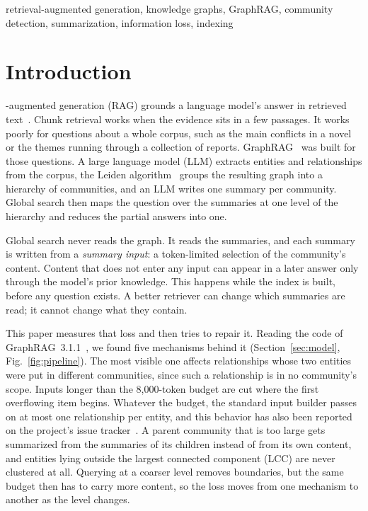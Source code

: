 \documentclass[journal]{IEEEtran}
\theoremstyle{remark}
\begin{document}
\begin{IEEEkeywords}
retrieval-augmented generation, knowledge graphs, GraphRAG, community detection, summarization, information loss, indexing
\end{IEEEkeywords}

\section{Introduction}

-augmented generation (RAG) grounds a language model's answer in retrieved text~\cite{lewis2020rag,gao2023ragsurvey}. Chunk retrieval works when the evidence sits in a few passages. It works poorly for questions about a whole corpus, such as the main conflicts in a novel or the themes running through a collection of reports. GraphRAG~\cite{edge2024graphrag} was built for those questions. A large language model (LLM) extracts entities and relationships from the corpus, the Leiden algorithm~\cite{traag2019leiden} groups the resulting graph into a hierarchy of communities, and an LLM writes one summary per community. Global search then maps the question over the summaries at one level of the hierarchy and reduces the partial answers into one.

Global search never reads the graph. It reads the summaries, and each summary is written from a \emph{summary input}: a token-limited selection of the community's content. Content that does not enter any input can appear in a later answer only through the model's prior knowledge. This happens while the index is built, before any question exists. A better retriever can change which summaries are read; it cannot change what they contain.

This paper measures that loss and then tries to repair it. Reading the code of GraphRAG~3.1.1~\cite{graphrag311}, we found five mechanisms behind it (Section~\ref{sec:model}, Fig.~\ref{fig:pipeline}). The most visible one affects relationships whose two entities were put in different communities, since such a relationship is in no community's scope. Inputs longer than the 8,000-token budget are cut where the first overflowing item begins. Whatever the budget, the standard input builder passes on at most one relationship per entity, and this behavior has also been reported on the project's issue tracker~\cite{grenat2026issue}. A parent community that is too large gets summarized from the summaries of its children instead of from its own content, and entities lying outside the largest connected component (LCC) are never clustered at all. Querying at a coarser level removes boundaries, but the same budget then has to carry more content, so the loss moves from one mechanism to another as the level changes.
\end{document}
